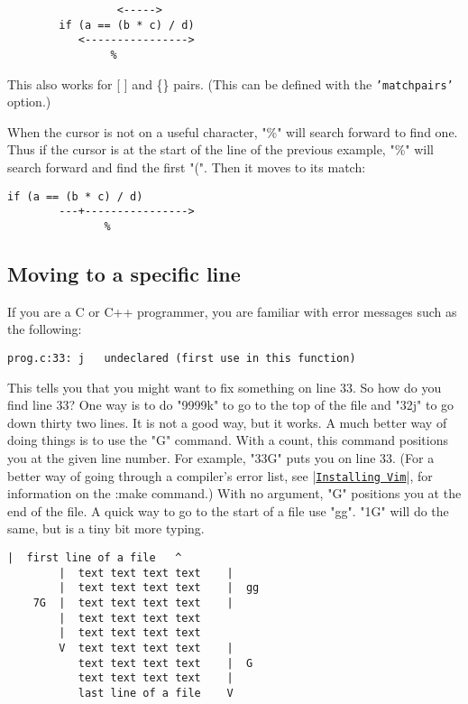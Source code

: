 \begin{Verbatim}[samepage=true]
                   %
                 <----->
        if (a == (b * c) / d) 
           <---------------->
                %
\end{Verbatim}

This also works for [ ] and \{\} pairs.
(This can be defined with the \texttt{'matchpairs'} option.)

When the cursor is not on a useful character, "\%" will search forward to find one.
Thus if the cursor is at the start of the line of the previous example, "\%" will search forward and find the first "(".
Then it moves to its match:

\begin{Verbatim}[samepage=true]
        if (a == (b * c) / d) 
        ---+---------------->
               %
\end{Verbatim}


\subsection{Moving to a specific line}

If you are a C or C++ programmer, you are familiar with error messages such as the following:

		\begin{Verbatim}[samepage=true]
    prog.c:33: j   undeclared (first use in this function) 
		\end{Verbatim}

This tells you that you might want to fix something on line 33.
So how do you find line 33?  One way is to do "9999k" to go to the top of the file and "32j" to go down thirty two lines.
It is not a good way, but it works.
A much better way of doing things is to use the "G" command.
With a count, this command positions you at the given line number.
For example, "33G" puts you on line 33.
(For a better way of going through a compiler's error list, see |\hyperref[Installing Vim]{\texttt{Installing Vim}}|, for information on the :make command.) With no argument, "G" positions you at the end of the file.
A quick way to go to the start of a file use "gg".
"1G" will do the same, but is a tiny bit more typing.
 
\begin{Verbatim}[samepage=true]
        |  first line of a file   ^
        |  text text text text    |
        |  text text text text    |  gg
    7G  |  text text text text    |
        |  text text text text
        |  text text text text
        V  text text text text    |
           text text text text    |  G
           text text text text    |
           last line of a file    V
\end{Verbatim}

